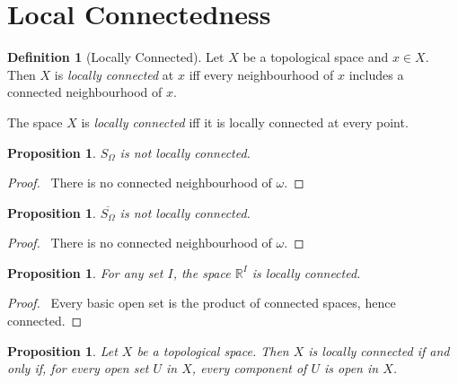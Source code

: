 \documentclass{report}
\let\qed\relax
\newtheorem{prop}[lm]{Proposition}
\theoremstyle{definition}
\newtheorem{df}[lm]{Definition}
\begin{document}
  \section{Local Connectedness}

  \begin{df}[Locally Connected]
    Let $X$ be a topological space and $x \in X$. Then $X$ is \emph{locally
      connected} at $x$ iff every neighbourhood of $x$ includes a connected
    neighbourhood of $x$.

    The space $X$ is \emph{locally connected} iff it is locally connected at
    every point.
  \end{df}

   \begin{prop}
  $S_\Omega$ is not locally connected.
 \end{prop}

 \begin{proof}
  \pf\ There is no connected neighbourhood of $\omega$. \qed
 \end{proof}

     \begin{prop}
     $\overline{S_\Omega}$ is not locally connected.
 \end{prop}

 \begin{proof}
  \pf\ There is no connected neighbourhood of $\omega$. \qed
 \end{proof}

  \begin{prop}
  	For any set $I$,
  	the space $\mathbb{R}^I$ is locally connected.
  \end{prop}

  \begin{proof}
  	\pf\ Every basic open set is the product of connected spaces, hence
  	connected. \qed
  \end{proof}

 \begin{prop}
    Let $X$ be a topological space. Then $X$ is locally connected if and only
    if, for every open set $U$ in $X$, every component of $U$ is open in $X$.
  \end{prop}
\end{document}
